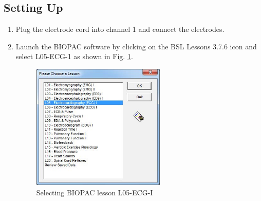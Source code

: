\documentclass{article}
\begin{document}
\subsection*{Setting Up}
\begin{enumerate}
	\item Plug the electrode cord into channel 1 and connect the electrodes.
	\item Launch the BIOPAC software by clicking on the BSL Lessons 3.7.6 icon and select L05-ECG-1 as shown in Fig. \ref{lesson}.
		
		\begin{figure}[h]
	\centering\includegraphics[width=0.6\textwidth]{../images/ECG_I_6.jpg}
		\caption{Selecting BIOPAC lesson L05-ECG-I}
		\label{lesson}
		\end{figure}
\end{enumerate}
\end{document}
